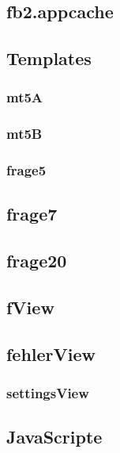 \documentclass[a4paper]{scrartcl}
\begin{document}
			\subsection{fb2.appcache}
				
%				
			\subsection{Templates}
				\subsubsection{mt5A}
					
				\subsubsection{mt5B}
					
				\subsubsection{frage5}
					
				\subsection{frage7}
					
				\subsection{frage20}
					
				\subsection{fView}
					
				\subsection{fehlerView}
					
				\subsubsection{settingsView}
					
			\subsection{JavaScripte}
\end{document}
